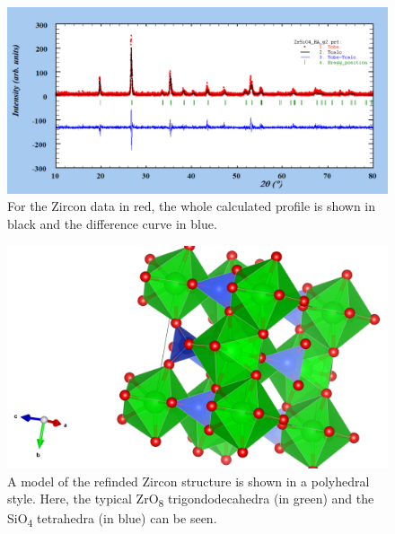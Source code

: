 \begin{figure}[ht]
    \centering
    \includegraphics[angle = 90, width = 0.7\linewidth]{Bilder/Auswertung/ZrSiO4/ZrSiO4DataAll.png}
    \caption{For the Zircon data in red, the whole calculated profile is shown in black and the difference curve in blue.}
    \label{fig:ZrSiO4Prof}
\end{figure}


\begin{figure}[ht]
    \centering
    \includegraphics[width = \linewidth]{Bilder/Auswertung/ZrSiO4/ZrSiO4StructurePolyhedral.png}
    \caption{A model of the refinded Zircon structure is shown in a polyhedral style. Here, the typical ZrO\textsubscript{8} trigondodecahedra (in green) and the SiO\textsubscript{4} tetrahedra (in blue) can be seen.}
    \label{fig:ZrSiO4Struct}
\end{figure}


